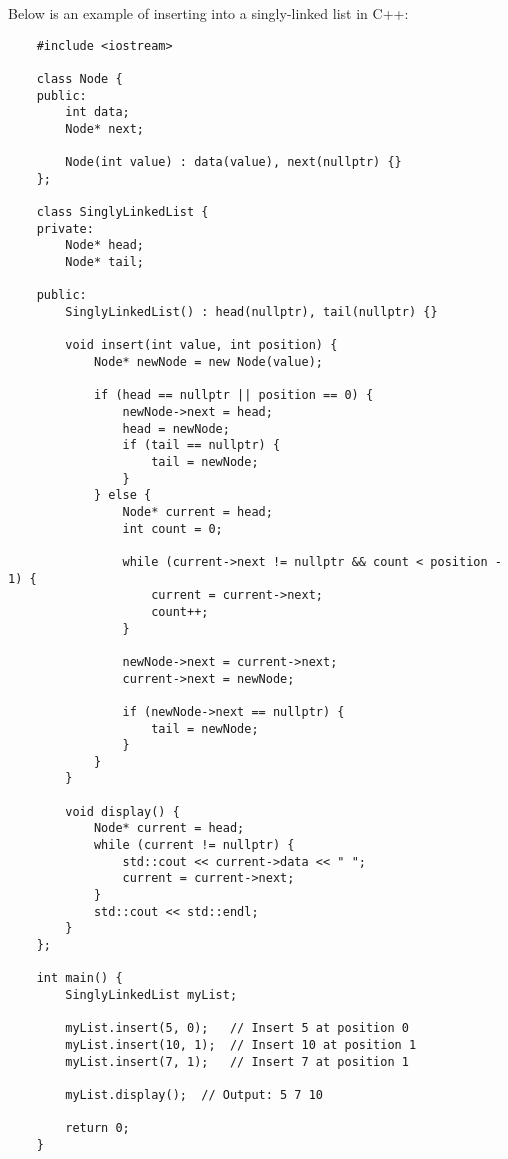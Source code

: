 \begin{solution}
    Below is an example of inserting into a singly-linked list in C++:

    \horizontalline

    \begin{verbatim}
    #include <iostream>

    class Node {
    public:
        int data;
        Node* next;
    
        Node(int value) : data(value), next(nullptr) {}
    };
    
    class SinglyLinkedList {
    private:
        Node* head;
        Node* tail;
    
    public:
        SinglyLinkedList() : head(nullptr), tail(nullptr) {}
    
        void insert(int value, int position) {
            Node* newNode = new Node(value);
    
            if (head == nullptr || position == 0) {
                newNode->next = head;
                head = newNode;
                if (tail == nullptr) {
                    tail = newNode;
                }
            } else {
                Node* current = head;
                int count = 0;
    
                while (current->next != nullptr && count < position - 1) {
                    current = current->next;
                    count++;
                }
    
                newNode->next = current->next;
                current->next = newNode;
    
                if (newNode->next == nullptr) {
                    tail = newNode;
                }
            }
        }
    
        void display() {
            Node* current = head;
            while (current != nullptr) {
                std::cout << current->data << " ";
                current = current->next;
            }
            std::cout << std::endl;
        }
    };
    
    int main() {
        SinglyLinkedList myList;
    
        myList.insert(5, 0);   // Insert 5 at position 0
        myList.insert(10, 1);  // Insert 10 at position 1
        myList.insert(7, 1);   // Insert 7 at position 1
    
        myList.display();  // Output: 5 7 10
    
        return 0;
    }        
    \end{verbatim}


\end{solution}
